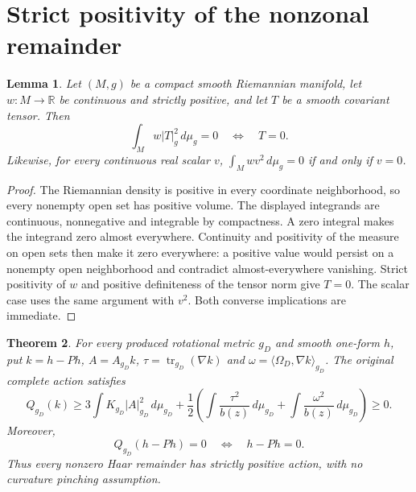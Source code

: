 \documentclass[11pt]{article}
\newtheorem{theorem}{Theorem}[section]
\newtheorem{lemma}[theorem]{Lemma}
\newcommand{\R}{\mathbb R}
\begin{document}
\section{Strict positivity of the nonzonal remainder}

\begin{lemma}\label{lem:weighted-energy-rigidity}
Let $(M,g)$ be a compact smooth Riemannian manifold, let $w:M\to\R$ be
continuous and strictly positive, and let $T$ be a smooth covariant tensor.
Then
\[
 \int_M w|T|_g^2\,d\mu_g=0\quad\Longleftrightarrow\quad T=0.
\]
Likewise, for every continuous real scalar $v$,
$\int_M wv^2\,d\mu_g=0$ if and only if $v=0$.
\end{lemma}

\begin{proof}
The Riemannian density is positive in every coordinate neighborhood, so every
nonempty open set has positive volume. The displayed integrands are continuous,
nonnegative and integrable by compactness. A zero integral makes the integrand
zero almost everywhere. Continuity and positivity of the measure on open sets
then make it zero everywhere: a positive value would persist on a nonempty
open neighborhood and contradict almost-everywhere vanishing. Strict positivity
of $w$ and positive definiteness of the tensor norm give $T=0$. The scalar case
uses the same argument with $v^2$. Both converse implications are immediate.
\end{proof}

\begin{theorem}\label{thm:nonzonal-positivity-rigidity}
For every produced rotational metric $g_D$ and smooth one-form $h$, put
$k=h-Ph$, $A=A_{g_D}k$, $\tau=\operatorname{tr}_{g_D}(\nabla k)$ and
$\omega=\langle\Omega_D,\nabla k\rangle_{g_D}$. The original complete action satisfies
\begin{equation}\label{eq:nonzonal-positive-budget}
 Q_{g_D}(k)\geq
 3\int K_{g_D}|A|_{g_D}^2\,d\mu_{g_D}
 +\frac12\left(\int\frac{\tau^2}{b(z)}\,d\mu_{g_D}
                 +\int\frac{\omega^2}{b(z)}\,d\mu_{g_D}\right)\geq0.
\end{equation}
Moreover,
\begin{equation}\label{eq:nonzonal-zero-rigidity}
 Q_{g_D}(h-Ph)=0\quad\Longleftrightarrow\quad h-Ph=0.
\end{equation}
Thus every nonzero Haar remainder has strictly positive action, with no
curvature pinching assumption.
\end{theorem}
\end{document}
